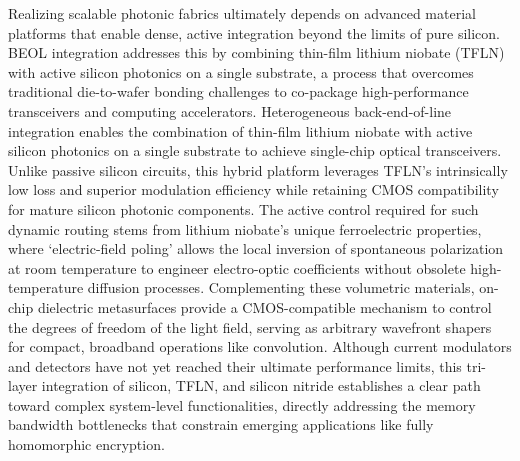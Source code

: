 \documentclass[11pt]{article}
\begin{document}
Realizing scalable photonic fabrics ultimately depends on advanced material platforms that enable dense, active integration beyond the limits of pure silicon. BEOL integration addresses this by combining thin-film lithium niobate (TFLN) with active silicon photonics on a single substrate, a process that overcomes traditional die-to-wafer bonding challenges to co-package high-performance transceivers and computing accelerators. Heterogeneous back-end-of-line integration enables the combination of thin-film lithium niobate with active silicon photonics on a single substrate to achieve single-chip optical transceivers. \citep{s2_9b444e84d20ae6e3d62d2d4df30268b5a53baad2_40af2cc9} Unlike passive silicon circuits, this hybrid platform leverages TFLN's intrinsically low loss and superior modulation efficiency while retaining CMOS compatibility for mature silicon photonic components. The active control required for such dynamic routing stems from lithium niobate's unique ferroelectric properties, where `electric-field poling' allows the local inversion of spontaneous polarization at room temperature to engineer electro-optic coefficients without obsolete high-temperature diffusion processes. \citep{s2_a1b7de5981aa9a6aa9f9bd0c4422d9b023fc454f_bec494c5} \citep{doi_10_1117_12_2654937_d0b4bc2b} Complementing these volumetric materials, on-chip dielectric metasurfaces provide a CMOS-compatible mechanism to control the degrees of freedom of the light field, serving as arbitrary wavefront shapers for compact, broadband operations like convolution. Although current modulators and detectors have not yet reached their ultimate performance limits, this tri-layer integration of silicon, TFLN, and silicon nitride establishes a clear path toward complex system-level functionalities, directly addressing the memory bandwidth bottlenecks that constrain emerging applications like fully homomorphic encryption. \citep{s2_9b444e84d20ae6e3d62d2d4df30268b5a53baad2_40af2cc9} \citep{doi_10_1126_science_abj4396_40f36a09} \citep{doi_10_1515_nanoph_2022_0294_1bd118d5} \citep{doi_10_1145_3806395_315ab915}
\end{document}
